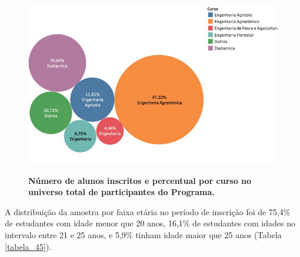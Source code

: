 \begin{figure}[H]
\caption{\textbf{Número de alunos inscritos e percentual por curso no universo total de participantes do Programa.}}
\centering
\includegraphics[scale=0.4]{Imagens/inscritos.png}
\label{figura_10}
\end{figure}

A distribuição da amostra por faixa etária no período de inscrição foi de 75,4\% de estudantes com idade menor que 20 anos, 16,1\% de estudantes com idades no intervalo entre 21 e 25 anos, e 5,9\% tinham idade maior que 25 anos (Tabela \ref{tabela_45}).


